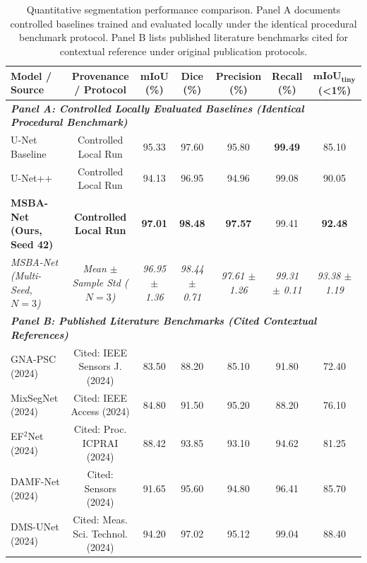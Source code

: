 \documentclass{ieeeaccess}
\begin{document}
\begin{table}[!t]
\centering
\setlength{\tabcolsep}{3pt}
\fontsize{7.8pt}{9.8pt}\selectfont
\caption{Quantitative segmentation performance comparison. Panel A documents controlled baselines trained and evaluated locally under the identical procedural benchmark protocol. Panel B lists published literature benchmarks cited for contextual reference under original publication protocols.}
\label{tab:benchmark}
\begin{tabular*}{\textwidth}{@{\extracolsep{\fill}}lcccccc@{}}
\toprule
\textbf{Model / Source} & \textbf{Provenance / Protocol} & \textbf{mIoU (\%)} & \textbf{Dice (\%)} & \textbf{Precision (\%)} & \textbf{Recall (\%)} & $\mathbf{mIoU}_{\mathbf{tiny}}$ \textbf{(<1\%)} \\
\midrule
\multicolumn{7}{l}{\textit{\textbf{Panel A: Controlled Locally Evaluated Baselines (Identical Procedural Benchmark)}}} \\
U-Net Baseline \cite{ronneberger2015unet} & Controlled Local Run & 95.33 & 97.60 & 95.80 & \textbf{99.49} & 85.10 \\
U-Net++ \cite{zhou2019unetplusplus} & Controlled Local Run & 94.13 & 96.95 & 94.96 & 99.08 & 90.05 \\
\textbf{MSBA-Net (Ours, Seed 42)} & \textbf{Controlled Local Run} & \textbf{97.01} & \textbf{98.48} & \textbf{97.57} & 99.41 & \textbf{92.48} \\
\textit{MSBA-Net (Multi-Seed, $N=3$)} & \textit{Mean $\pm$ Sample Std ($N=3$)} & \textit{96.95 $\pm$ 1.36} & \textit{98.44 $\pm$ 0.71} & \textit{97.61 $\pm$ 1.26} & \textit{99.31 $\pm$ 0.11} & \textit{93.38 $\pm$ 1.19} \\
\midrule
\multicolumn{7}{l}{\textit{\textbf{Panel B: Published Literature Benchmarks (Cited Contextual References)}}} \\
GNA-PSC (2024) \cite{zhang2024gnapsc} & Cited: IEEE Sensors J. (2024) & 83.50 & 88.20 & 85.10 & 91.80 & 72.40 \\
MixSegNet (2024) \cite{zhou2024mixsegnet} & Cited: IEEE Access (2024) & 84.80 & 91.50 & 95.20 & 88.20 & 76.10 \\
EF$^2$Net (2024) \cite{li2024ef2net} & Cited: Proc. ICPRAI (2024) & 88.42 & 93.85 & 93.10 & 94.62 & 81.25 \\
DAMF-Net (2024) \cite{liu2024damfnet} & Cited: Sensors (2024) & 91.65 & 95.60 & 94.80 & 96.41 & 85.70 \\
DMS-UNet (2024) \cite{liu2024dmsunet} & Cited: Meas. Sci. Technol. (2024) & 94.20 & 97.02 & 95.12 & 99.04 & 88.40 \\
\bottomrule
\end{tabular*}
\end{table}
\end{document}

